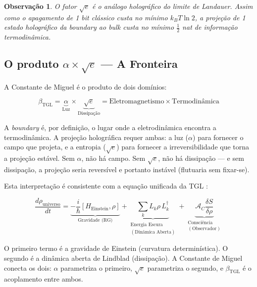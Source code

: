 \documentclass[12pt,a4paper,twoside]{article}
\newtheorem{remark}[theorem]{Observação}
\newcommand{\betatgl}{\beta_{\!\scriptscriptstyle\mathrm{TGL}}}
\newcommand{\boundary}{\textit{boundary}}
\newcommand{\bulk}{\textit{bulk}}
\begin{document}
\begin{remark}
O fator $\sqrt{e}$ é o análogo holográfico do limite de Landauer. Assim como o apagamento de 1 bit clássico custa no mínimo $k_B T \ln 2$, a projeção de 1 estado holográfico da \boundary{} ao \bulk{} custa no mínimo $\frac{1}{2}$ nat de informação termodinâmica.
\end{remark}


\subsection{O produto $\alpha \times \sqrt{e}$ --- A Fronteira}

A Constante de Miguel é o produto de dois domínios:

\begin{factorbox}[title={Síntese}]
\begin{equation}
\betatgl = \underbrace{\alpha}_{\text{Luz}} \times \underbrace{\sqrt{e}}_{\text{Dissipação}} = \text{Eletromagnetismo} \times \text{Termodinâmica}
\label{eq:sintese}
\end{equation}
\end{factorbox}

\noindent A \boundary{} é, por definição, o lugar onde a eletrodinâmica encontra a termodinâmica. A projeção holográfica requer ambas: a luz ($\alpha$) para fornecer o campo que projeta, e a entropia ($\sqrt{e}$) para fornecer a irreversibilidade que torna a projeção estável. Sem $\alpha$, não há campo. Sem $\sqrt{e}$, não há dissipação --- e sem dissipação, a projeção seria reversível e portanto instável (flutuaria sem fixar-se).

Esta interpretação é consistente com a equação unificada da TGL \cite{Miguel2026Fronteira}:

\begin{equation}
\frac{d\rho_{\text{universo}}}{dt} = \underbrace{-\frac{i}{\hbar}[H_{\text{Einstein}}, \rho]}_{\text{Gravidade (RG)}} + \underbrace{\sum_k L_k\rho\, L_k^\dagger}_{\substack{\text{Energia Escura}\\(\text{Dinâmica Aberta})}} + \underbrace{\mathcal{A}_C\frac{\delta S}{\delta\rho}}_{\substack{\text{Consciência}\\(\text{Observador})}}
\end{equation}

O primeiro termo é a gravidade de Einstein (curvatura determinística). O segundo é a dinâmica aberta de Lindblad (dissipação). A Constante de Miguel conecta os dois: $\alpha$ parametriza o primeiro, $\sqrt{e}$ parametriza o segundo, e $\betatgl$ é o acoplamento entre ambos.
\end{document}

